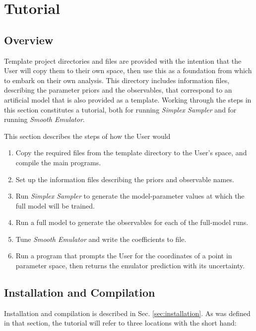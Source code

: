 \documentclass[UserManual.tex]{subfiles}
\begin{document}
\setcounter{section}{7}
\section{Tutorial}\label{sec:tutorial}

\subsection{Overview}
Template project directories and files are provided with the intention that the User will copy them to their own space, then use this as a foundation from which to embark on their own analysis. This directory includes information files, describing the parameter priors and the observables, that correspond to an artificial model that is also provided as a template. Working through the steps in this section constitutes a tutorial, both for running {\it Simplex Sampler} and for running {\it Smooth Emulator}.

This section describes the steps of how the User would
\begin{enumerate}\itemsep=0pt
\item Copy the required files from the template directory to the User's space, and compile the main programs.
\item Set up the information files describing the priors and observable names.
\item Run {\it Simplex Sampler} to generate the model-parameter values at which the full model will be trained.
\item Run a full model to generate the observables for each of the full-model runs.
\item Tune {\it Smooth Emulator} and write the coefficients to file.
\item Run a program that prompts the User for the coordinates of a point in parameter space, then returns the emulator prediction with its uncertainty.
\end{enumerate}

\subsection{Installation and Compilation}
Installation and compilation is described in Sec. \ref{sec:installation}. As was defined in that section, the tutorial will refer to three locations with the short hand:

\vspace*{0.2in}
\end{document}
